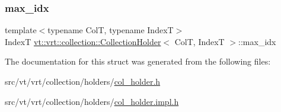 \subsubsection{\texorpdfstring{max\+\_\+idx}{max\_idx}}
{\footnotesize\ttfamily template$<$typename ColT, typename IndexT$>$ \\
IndexT \hyperlink{structvt_1_1vrt_1_1collection_1_1_collection_holder}{vt\+::vrt\+::collection\+::\+Collection\+Holder}$<$ ColT, IndexT $>$\+::max\+\_\+idx}



The documentation for this struct was generated from the following files\+:\begin{DoxyCompactItemize}
\item 
src/vt/vrt/collection/holders/\hyperlink{col__holder_8h}{col\+\_\+holder.\+h}\item 
src/vt/vrt/collection/holders/\hyperlink{col__holder_8impl_8h}{col\+\_\+holder.\+impl.\+h}\end{DoxyCompactItemize}
